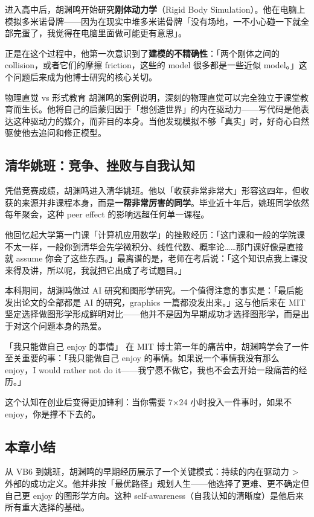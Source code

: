 \documentclass[a4paper]{article}
\begin{document}
进入高中后，胡渊鸣开始研究\textbf{刚体动力学}（Rigid Body Simulation）。他在电脑上模拟多米诺骨牌——因为在现实中堆多米诺骨牌「没有场地，一不小心碰一下就全部完蛋了，我觉得在电脑里面做可能更有意思」。

正是在这个过程中，他第一次意识到了\textbf{建模的不精确性}：「两个刚体之间的 collision，或者它们的摩擦 friction，这些的 model 很多都是一些近似 model。」这个问题后来成为他博士研究的核心关切。

\begin{knowledgebox}{物理直觉 vs 形式教育}
胡渊鸣的案例说明，深刻的物理直觉可以完全独立于课堂教育而生长。他将自己的启蒙归因于「想创造世界」的内在驱动力——写代码是他表达这种驱动力的媒介，而非目的本身。当他发现模拟不够「真实」时，好奇心自然驱使他去追问和修正模型。
\end{knowledgebox}

\subsection{清华姚班：竞争、挫败与自我认知}

凭借竞赛成绩，胡渊鸣进入清华姚班。他以「收获非常非常大」形容这四年，但收获的来源并非课程本身，而是\textbf{一帮非常厉害的同学}。毕业近十年后，姚班同学依然每年聚会，这种 peer effect 的影响远超任何单一课程。

他回忆起大学第一门课「计算机应用数学」的挫败经历：「这门课和一般的学院课不太一样，一般你到清华会先学微积分、线性代数、概率论……那门课好像是直接就 assume 你会了这些东西。」最离谱的是，老师在考后说：「这个知识点我上课没来得及讲，所以呢，我就把它出成了考试题目。」

本科期间，胡渊鸣做过 AI 研究和图形学研究。一个值得注意的事实是：「最后能发出论文的全部都是 AI 的研究，graphics 一篇都没发出来。」这与他后来在 MIT 坚定选择做图形学形成鲜明对比——他并不是因为早期成功才选择图形学，而是出于对这个问题本身的热爱。

\begin{importantbox}{「我只能做自己 enjoy 的事情」}
在 MIT 博士第一年的痛苦中，胡渊鸣学会了一件至关重要的事：「我只能做自己 enjoy 的事情。如果说一个事情我没有那么 enjoy，I would rather not do it——我宁愿不做它，我也不会去开始一段痛苦的经历。」

这个认知在创业后变得更加锋利：当你需要 7×24 小时投入一件事时，如果不 enjoy，你是撑不下去的。
\end{importantbox}

\subsection{本章小结}
从 VB6 到姚班，胡渊鸣的早期经历展示了一个关键模式：持续的内在驱动力 {\textgreater} 外部的成功定义。他并非按「最优路径」规划人生——他选择了更难、更不确定但自己更 enjoy 的图形学方向。这种 self-awareness（自我认知的清晰度）是他后来所有重大选择的基础。
\end{document}
